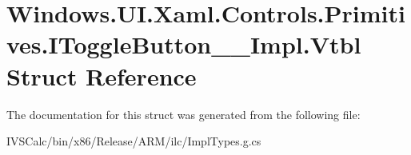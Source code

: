 \hypertarget{struct_windows_1_1_u_i_1_1_xaml_1_1_controls_1_1_primitives_1_1_i_toggle_button_____impl_1_1_vtbl}{}\section{Windows.\+U\+I.\+Xaml.\+Controls.\+Primitives.\+I\+Toggle\+Button\+\_\+\+\_\+\+Impl.\+Vtbl Struct Reference}
\label{struct_windows_1_1_u_i_1_1_xaml_1_1_controls_1_1_primitives_1_1_i_toggle_button_____impl_1_1_vtbl}


The documentation for this struct was generated from the following file\+:\begin{DoxyCompactItemize}
\item 
I\+V\+S\+Calc/bin/x86/\+Release/\+A\+R\+M/ilc/Impl\+Types.\+g.\+cs\end{DoxyCompactItemize}
